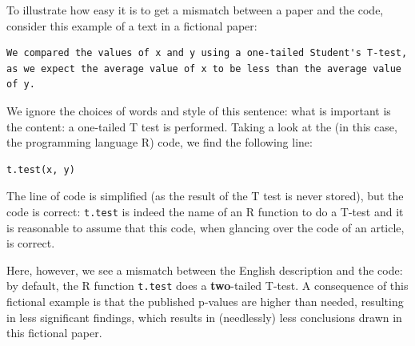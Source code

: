 To illustrate how easy it is to get a mismatch between a paper
and the code, consider this example
of a text in a fictional paper:

\begin{verbatim}
We compared the values of x and y using a one-tailed Student's T-test,
as we expect the average value of x to be less than the average value of y.
\end{verbatim}

We ignore the choices of words and style of this sentence: what is
important is the content: a one-tailed T test is performed.
Taking a look at the (in this case, the programming language R) code, 
we find the following line:

\begin{verbatim}
t.test(x, y)
\end{verbatim}

The line of code is simplified (as the result of the T test is never stored),
but the code is correct:
\verb|t.test| is indeed the name of an R function to do a T-test
and it is reasonable to assume that this code, when glancing over the code
of an article, is correct.

Here, however, we see a mismatch between the English description and the code:
by default, the R function \verb|t.test| does a \textbf{two}-tailed T-test.
A consequence of this fictional example is that the published p-values are
higher than needed, resulting in less significant findings, which
results in (needlessly) less conclusions drawn in this fictional paper.

